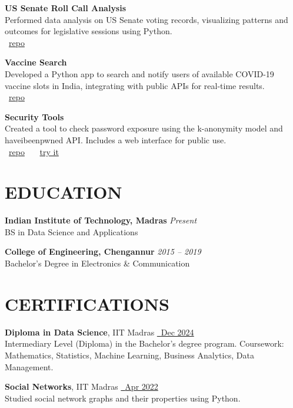 \documentclass[11pt,a4paper]{article}
\begin{document}
\textbf{US Senate Roll Call Analysis} \\
Performed data analysis on US Senate voting records, visualizing patterns and outcomes for legislative sessions using Python. \\
\faGithub~\href{https://github.com/jishnujp/US_senate_roll_call}{\textcolor{linkgray}{repo}}

\textbf{Vaccine Search} \\
Developed a Python app to search and notify users of available COVID-19 vaccine slots in India, integrating with public APIs for real-time results. \\
\faGithub~\href{https://github.com/jishnujp/vaccine_search}{\textcolor{linkgray}{repo}}

\textbf{Security Tools} \\
Created a tool to check password exposure using the k-anonymity model and haveibeenpwned API. Includes a web interface for public use. \\
\faGithub~\href{https://github.com/jishnujp/securityTools}{\textcolor{linkgray}{repo}} \, \textbar{} \,
\faGlobe~\href{https://jishnujp.github.io/securityTools}{\textcolor{linkgray}{try it}}

\section*{EDUCATION}
\textbf{Indian Institute of Technology, Madras} \hfill \textit{Present} \\
BS in Data Science and Applications

\textbf{College of Engineering, Chengannur} \hfill \textit{2015 -- 2019} \\
Bachelor's Degree in Electronics \& Communication

\section*{CERTIFICATIONS}
\textbf{Diploma in Data Science}, IIT Madras \hfill
\href{https://jishnujp.github.io/certificates/data_science_diploma.pdf}{\faFilePdfO~\textcolor{linkgray}{Dec 2024}} \\
Intermediary Level (Diploma) in the Bachelor's degree program. Coursework: Mathematics, Statistics, Machine Learning, Business Analytics, Data Management.

\textbf{Social Networks}, IIT Madras \hfill
\href{https://archive.nptel.ac.in/content/noc/NOC22/SEM1/Ecertificates/106/noc22-cs30/Course/NPTEL22CS30S4373058402018648.jpg}{\faFilePdfO~\textcolor{linkgray}{Apr 2022}} \\
Studied social network graphs and their properties using Python.
\end{document}
